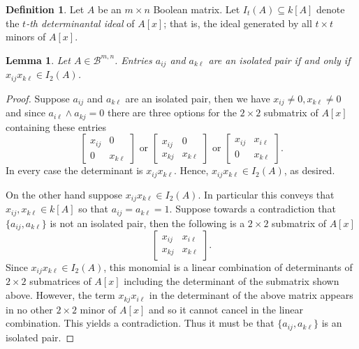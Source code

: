 \documentclass[11pt,letterpaper, reqno]{amsart}
\newtheorem{lemma}[theorem]{Lemma}
\theoremstyle{definition}
\newtheorem{definition}[theorem]{Definition}
\theoremstyle{remark}
\newcommand{\Bc}{\mathcal{B}}
\numberwithin{equation}{section}
\begin{document}
\begin{definition}
    Let $A$ be an $m\times n$ Boolean matrix. Let $I_t(A)\subseteq k[A]$ denote the \textit{$t$-th determinantal ideal} of $A[x]$; that is, the ideal generated by all $t\times t$ minors of $A[x]$.
\end{definition}




\begin{lemma}\label{lem: 2x2 minors}
    Let $A\in \Bc^{m,n}$. Entries $a_{ij}$ and $a_{k\ell}$ are an isolated pair if and only if $x_{ij}x_{k\ell}\in I_2(A)$. 
\end{lemma}
\begin{proof}
Suppose $a_{ij}$ and $a_{k\ell}$ are an isolated pair, %
 then we have $x_{ij}\neq 0, x_{k\ell}\neq 0$ and since $a_{i\ell}\wedge a_{kj}=0$ there are three options for the $2\times 2$ submatrix of $A[x]$ containing these entries
\[
\begin{bmatrix}
    x_{ij}& 0\\
    0 & x_{k\ell}
\end{bmatrix} \text{ or } 
\begin{bmatrix}
    x_{ij}& 0\\
    x_{kj} & x_{k\ell}
\end{bmatrix} \text{ or }
\begin{bmatrix}
    x_{ij}& x_{i\ell}\\
    0 & x_{k\ell}
\end{bmatrix}.
\]
In every case the determinant is $x_{ij}x_{k\ell}$. Hence, $x_{ij}x_{k\ell}\in I_2(A)$, as desired. 

On the other hand suppose $x_{ij}x_{k\ell}\in I_2(A)$. In particular this conveys that $x_{ij},x_{k\ell}\in k[A]$ so that $a_{ij}=a_{k\ell}=1$. 
Suppose towards a  contradiction that $\{a_{ij},a_{k\ell}\}$ is not an isolated pair, 
then the following is  a $2\times 2$ submatrix of $A[x]$\[
\begin{bmatrix}
    x_{ij} & x_{i\ell}\\
    x_{kj}& x_{k\ell}
\end{bmatrix}.
\]
Since $x_{ij}x_{k\ell}\in I_2(A)$, this monomial is a linear combination of determinants of $2\times 2$ submatrices of $A[x]$ including the determinant of the submatrix shown above.
However, the term $x_{kj}x_{i\ell}$ in the determinant of the above matrix appears in no other $2\times 2$ minor of $A[x]$ and so it cannot cancel in the linear combination. This yields a contradiction. Thus it must be that $\{a_{ij},a_{k\ell}\}$ is an isolated pair.
\end{proof}
\end{document}

